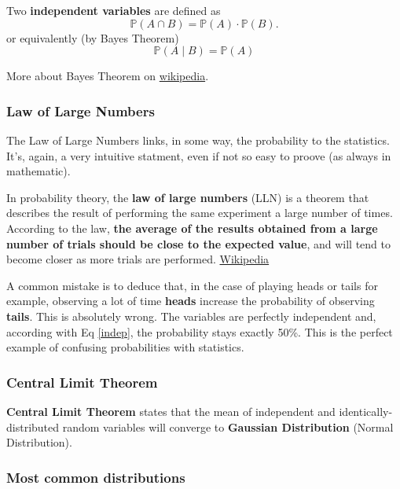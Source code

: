 \documentclass[a4paper,11pt,twoside]{article}
\newcommand*{\signed}[1]{%
  \unskip\hspace*{1em plus 1fill}%
  \nolinebreak[3]\hspace*{\fill}\mbox{#1}
}
\def \be {\begin{equation}}
\def \ee {\end{equation}}
\begin{document}
Two \textbf{independent variables} are defined as
\be
{\mathbb  {P}}(A\cap B)={\mathbb  {P}}(A)\cdot {\mathbb  {P}}(B).
\ee
or equivalently (by Bayes Theorem)
\be
\label{indep}
{\mathbb  {P}}(A\mid B) =  {\mathbb  {P}}(A)
\ee

More about Bayes Theorem on \href{https://en.wikipedia.org/wiki/Random_variable}{wikipedia}.

\subsubsection{Law of Large Numbers}

The Law of Large Numbers links, in some way, the probability to the statistics. It's, again, a very intuitive statment, even if not so easy to proove (as always in mathematic).

\begin{framed}
In probability theory, the\textbf{ law of large numbers} (LLN) is a theorem that describes the result of performing the same experiment a large number of times. According to the law, \textbf{the average of the results obtained from a large number of trials should be close to the expected value}, and will tend to become closer as more trials are performed.
\signed{\href{https://en.wikipedia.org/wiki/Law_of_large_numbers}{Wikipedia}}
\end{framed}

A common mistake is to deduce that, in the case of playing heads or tails for example, observing a lot of time \textbf{heads} increase the probability of observing \textbf{tails}. This is absolutely wrong. The variables are perfectly independent and, according with Eq \ref{indep}, the probability stays exactly 50\%. This is the perfect example of confusing probabilities with statistics.

\subsubsection{Central Limit Theorem}

\textbf{Central Limit Theorem} states that the mean of independent and identically-distributed random variables will converge to \textbf{Gaussian Distribution} (Normal Distribution).

\subsubsection{Most common distributions}
\end{document}
